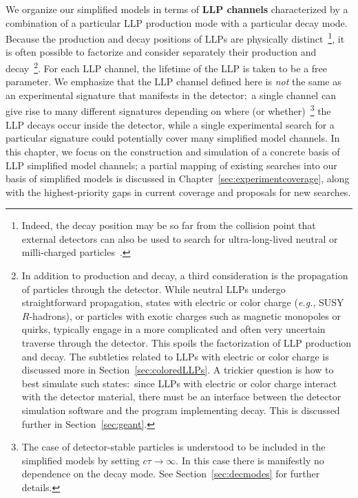 We organize our simplified models in terms of {\bf LLP channels} characterized by a combination of a particular LLP production mode with a particular decay mode.
Because the production and decay positions of LLPs are physically distinct~\footnote{Indeed, the decay position may be so far from the collision point that external detectors can also be used to search for ultra-long-lived neutral or milli-charged particles~\cite{Pinfold:1181486,Haas:2014dda,Chou:2016lxi,Gligorov:2017nwh,Feng:2017uoz}. }, it is often possible to factorize and consider separately their production and decay~\footnote{In addition to production and decay, a third consideration is the propagation of particles through the detector. While neutral LLPs undergo straightforward propagation, states with electric or color charge (\emph{e.g.}, SUSY $R$-hadrons), or particles with exotic charges such as magnetic monopoles or quirks, typically engage in a more complicated and often very uncertain traverse through the detector. This spoils the factorization of LLP production and decay.  The subtleties related to LLPs with electric or color charge is discussed more in Section~\ref{sec:coloredLLPs}. A trickier question is how to best simulate such states:~since LLPs with electric or color charge interact with the detector material, there must be an interface between the detector simulation software and the program implementing decay. This is discussed further in Section~\ref{sec:geant}.}.
For each LLP channel, the lifetime of the LLP is taken to be a free parameter.
We emphasize that the LLP channel defined here is \emph{not} the same as an experimental signature that manifests in the detector:~a single channel can give rise to many different signatures depending on where (or whether)~\footnote{The case of detector-stable particles is understood to be included in the simplified models by setting $c\tau\to\infty$. In this case there is manifestly no dependence on the decay mode. See Section~\ref{sec:decmodes} for further details.} the LLP decays occur inside the detector, while a single experimental search for a particular signature could potentially cover many simplified model channels.
In this chapter, we focus on the construction and simulation of a concrete basis of LLP simplified model channels; a partial mapping of existing searches into our basis of simplified models is discussed in Chapter~\ref{sec:experimentcoverage}, along with the highest-priority gaps in current coverage and proposals for new searches.

